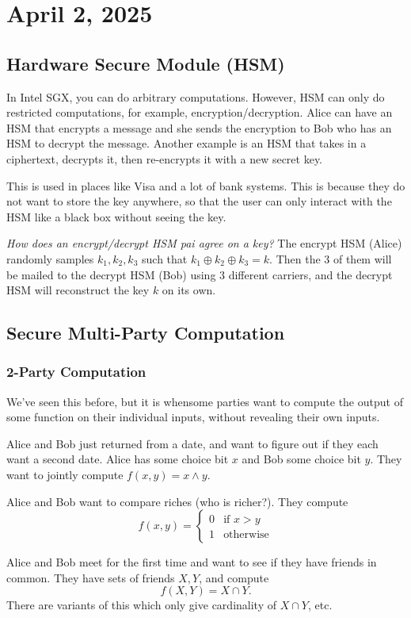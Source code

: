 \section{April 2, 2025}
\label{20250402}

\subsection{Hardware Secure Module (HSM)}

In Intel SGX, you can do arbitrary computations. However, HSM can only do restricted computations, for example, encryption/decryption. Alice can have an HSM that encrypts a message and she sends the encryption to Bob who has an HSM to decrypt the message. Another example is an HSM that takes in a ciphertext, decrypts it, then re-encrypts it with a new secret key.

This is used in places like Visa and a lot of bank systems. This is because they do not want to store the key anywhere, so that the user can only interact with the HSM like a black box without seeing the key.

\textit{How does an encrypt/decrypt HSM pai agree on a key?} The encrypt HSM (Alice) randomly samples $k_1, k_2, k_3$ such that $k_1 \oplus k_2 \oplus k_3 = k$. Then the 3 of them will be mailed to the decrypt HSM (Bob) using 3 different carriers, and the decrypt HSM will reconstruct the key $k$ on its own.

\subsection{Secure Multi-Party Computation}

\subsubsection{2-Party Computation}

We've seen this before, but it is whensome parties want to compute the output of some function on their individual inputs, without revealing their own inputs.

\begin{example}
    Alice and Bob just returned from a date, and want to figure out if they each want a second date. Alice has some choice bit $x$ and Bob some choice bit $y$. They want to jointly compute $f(x, y) = x\land y$.
\end{example}
\begin{example}
    Alice and Bob want to compare riches (who is richer?). They compute
    \[f(x, y) = \begin{cases}
            0 & \text{if }x>y    \\
            1 & \text{otherwise}
        \end{cases}\]
\end{example}
\begin{example}
    Alice and Bob meet for the first time and want to see if they have friends in common. They have sets of friends $X,Y$, and compute
    \[f(X, Y) = X\cap Y.\]
    There are variants of this which only give cardinality of $X\cap Y$, etc.
\end{example}

